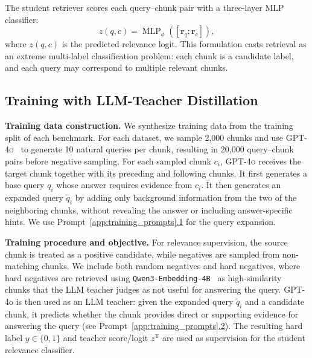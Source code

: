 The student retriever scores each query--chunk pair with a three-layer MLP classifier:
\begin{equation}
    z(q,c) =
    \operatorname{MLP}_{\phi}([\mathbf{r}_q ; \mathbf{r}_c]),
\end{equation}
where $z(q,c)$ is the predicted relevance logit. This formulation casts retrieval as an extreme multi-label classification problem: each chunk is a candidate label, and each query may correspond to multiple relevant chunks.

\subsection{Training with LLM-Teacher Distillation}
\label{sec:training}

\noindent
\textbf{Training data construction. }
We synthesize training data from the training split of each benchmark. For each dataset, we sample 2{,}000 chunks and use \textsc{GPT-4o}~\cite{openai2024gpt4o} to generate 10 natural queries per chunk, resulting in 20{,}000 query--chunk pairs before negative sampling. For each sampled chunk $c_i$, \textsc{GPT-4o} receives the target chunk together with its preceding and following chunks. It first generates a base query $q_i$ whose answer requires evidence from $c_i$. It then generates an expanded query $\tilde{q}_i$ by adding only background information from the two of the neighboring chunks, without revealing the answer or including answer-specific hints. We use Prompt~\hyperref[app:training_prompts]{\ref*{app:training_prompts}.1} for the query expansion.

\noindent
\textbf{Training procedure and objective. }
For relevance supervision, the source chunk is treated as a positive candidate, while negatives are sampled from non-matching chunks. We include both random negatives and hard negatives, where hard negatives are retrieved using \texttt{Qwen3-Embedding-4B}~\cite{zhang2025qwen3embeddingadvancingtext} as high-similarity chunks that the LLM teacher judges as not useful for answering the query. GPT-4o is then used as an LLM teacher: given the expanded query $\tilde{q}_i$ and a candidate chunk, it predicts whether the chunk provides direct or supporting evidence for answering the query (see Prompt~\hyperref[app:training_prompts]{\ref*{app:training_prompts}.2}). The resulting hard label $y \in \{0,1\}$ and teacher score/logit $z^{\mathrm{T}}$ are used as supervision for the student relevance classifier.

